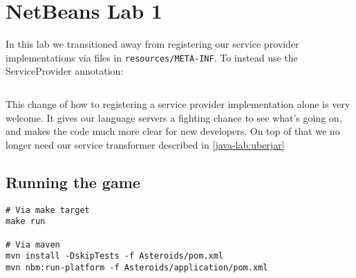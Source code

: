 \section{NetBeans Lab 1}

In this lab we transitioned away from registering our service provider
implementations via files in \texttt{resources/META-INF}. To instead use the
ServiceProvider annotation:

\inputminted{java}{code/openide-service-provider.java}

This change of how to registering a service provider implementation alone is
very welcome. It gives our language servers a fighting chance to see what's
going on, and makes the code much more clear for new developers. On top of that
we no longer need our service transformer described in \ref{java-lab:uberjar}

\subsection{Running the game}
\begin{verbatim}
# Via make target
make run

# Via maven
mvn install -DskipTests -f Asteroids/pom.xml
mvn nbm:run-platform -f Asteroids/application/pom.xml
\end{verbatim}
